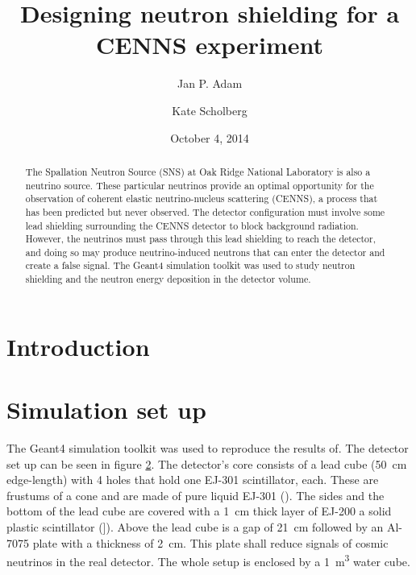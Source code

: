 \documentclass[12pt]{article}
\begin{document}
 

\title{Designing neutron shielding for a CENNS experiment} 

\author[1]{Jan P. Adam} 
\author[2]{Kate Scholberg} 
\date{October 4, 2014} 

\maketitle
\begin{abstract}
The Spallation Neutron Source (SNS) at Oak Ridge National Laboratory is also a neutrino source.  These particular neutrinos provide an optimal opportunity for the observation of coherent elastic neutrino-nucleus scattering (CENNS), a process that has been predicted but never observed. The detector configuration must involve some lead shielding surrounding the CENNS detector to block background radiation. However, the neutrinos must pass through this lead shielding to reach the detector, and doing so may produce neutrino-induced neutrons that can enter the detector and create a false signal. The Geant4 simulation toolkit was used to study neutron shielding and the neutron energy deposition in the detector volume.
\end{abstract}
\newpage

\section{Introduction}



\section{Simulation set up}

The Geant4 simulation toolkit was used to reproduce the results of. The detector set up can be seen in figure \ref{}. The detector's core consists of a lead cube (\SI{50}{cm} edge-length) with 4 holes that hold one EJ-301 scintillator, each. These are frustums of a cone and are made of pure liquid EJ-301 (). The sides and the bottom of the lead cube are covered with a \SI{1}{cm} thick layer of EJ-200 a solid plastic scintillator (]). Above the lead cube is a gap of \SI{21}{cm} followed by an Al-7075 plate with a thickness of \SI{2}{cm}. This plate shall reduce signals of cosmic neutrinos in the real detector. The whole setup is enclosed by a \SI{1}{m^3} water cube.
\end{document}

